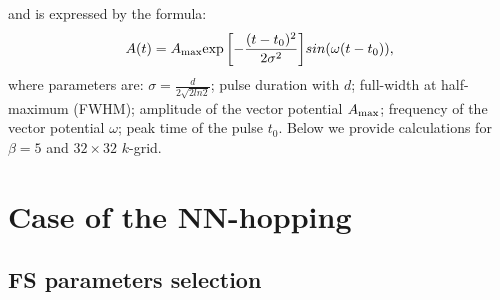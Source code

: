 and is expressed by the formula:
\begin{equation}
A(t)={A_{\rm max}{\rm exp}\left[-\frac{(t-t_0)^2}{2\sigma ^2}\right]}sin(\omega(t-t_0)),
\label{Ashape}
\end{equation}
where parameters are:
$\sigma=\frac{d}{2\sqrt{2ln2}}$; pulse duration with $d$; full-width at half-maximum (FWHM);
amplitude of the vector potential $A_{\rm max}$;
frequency of the vector potential $\omega$;
peak time of the pulse $t_0$.
Below we provide calculations for $\beta=5$ and $32 \times 32$ $k$-grid. 

\FloatBarrier

\section{Case of the NN-hopping}

\subsection{FS parameters selection}

